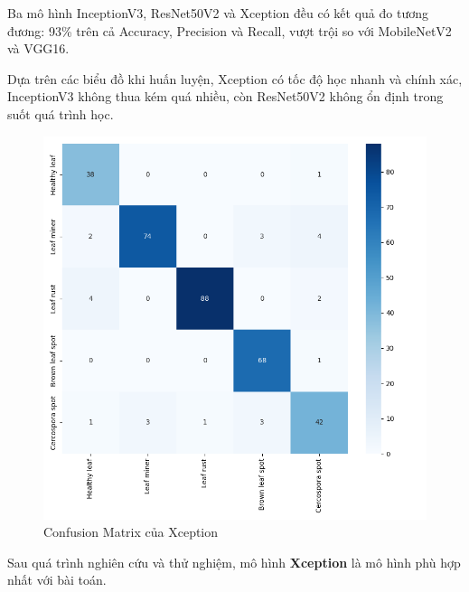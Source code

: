 \documentclass[a4paper,14pt]{extarticle}
\begin{document}
	Ba mô hình InceptionV3, ResNet50V2 và Xception đều có kết quả đo tương đương: 93\% trên cả Accuracy, Precision và Recall, vượt trội so với MobileNetV2 và VGG16.
	
	Dựa trên các biểu đồ khi huấn luyện, Xception có tốc độ học nhanh và chính xác, InceptionV3 không thua kém quá nhiều, còn ResNet50V2 không ổn định trong suốt quá trình học.

	\begin{figure}[H]
		\centering
		\includegraphics[scale=0.5]{images/xception_matrix.png}
		\caption{Confusion Matrix của Xception}
	\end{figure}

	Sau quá trình nghiên cứu và thử nghiệm, mô hình \textbf{Xception} là mô hình phù hợp nhất với bài toán.
\end{document}
